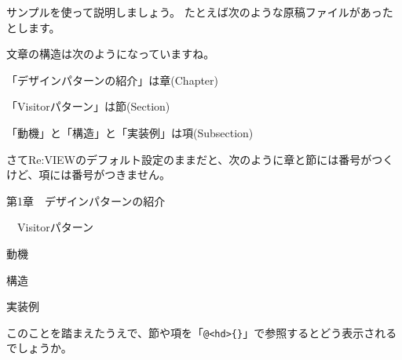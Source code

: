サンプルを使って説明しましょう。
たとえば次のような原稿ファイルがあったとします。

\begin{starterprogram}\end{starterprogram}

文章の構造は次のようになっていますね。

\begin{starteritemize}
\item 「デザインパターンの紹介」は章(Chapter)

\begin{starteritemize}
\item 「Visitorパターン」は節(Section)

\begin{starteritemize}
\item 「動機」と「構造」と「実装例」は項(Subsection)
\end{starteritemize}

\end{starteritemize}

\end{starteritemize}

さてRe:VIEWのデフォルト設定のままだと、次のように章と節には番号がつくけど、項には番号がつきません。

\vspace*{\baselineskip}
\noindent
{}

\starterresult
\vspace*{\baselineskip}
\par\noindent
{\LARGE\headfont 第1章　デザインパターンの紹介}
\bigskip
\par\noindent
{\Large{}　Visitorパターン}
\bigskip
\par\noindent
{\large\headfont 動機}
\bigskip
\par\noindent
{\large\headfont  構造}
\bigskip
\par\noindent
{\large\headfont  実装例}
\par
\vspace*{\baselineskip}
\endstarterresult

このことを踏まえたうえで、節や項を「\texttt{@}\texttt{\textless{}hd\textgreater{}\{\}}」で参照するとどう表示されるでしょうか。

